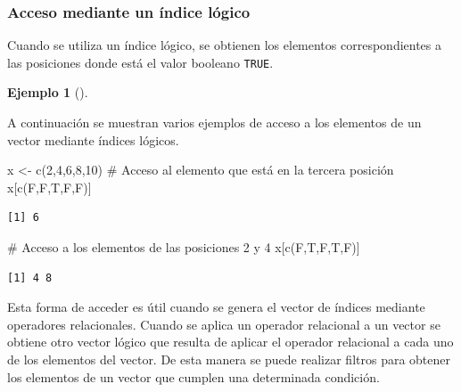 \documentclass[
  a4paper,
]{scrreport}
\newenvironment{Shaded}{\begin{snugshade}}{\end{snugshade}}
\newcommand{\CommentTok}[1]{\textcolor[rgb]{0.37,0.37,0.37}{#1}}
\newcommand{\DecValTok}[1]{\textcolor[rgb]{0.68,0.00,0.00}{#1}}
\newcommand{\FunctionTok}[1]{\textcolor[rgb]{0.28,0.35,0.67}{#1}}
\newcommand{\NormalTok}[1]{\textcolor[rgb]{0.00,0.23,0.31}{#1}}
\newcommand{\OtherTok}[1]{\textcolor[rgb]{0.00,0.23,0.31}{#1}}
\theoremstyle{definition}
\newtheorem{example}{Ejemplo}[chapter]
\theoremstyle{definition}
\theoremstyle{remark}
\begin{document}
\hypertarget{acceso-mediante-un-uxedndice-luxf3gico}{%
\subsubsection{Acceso mediante un índice
lógico}\label{acceso-mediante-un-uxedndice-luxf3gico}}

Cuando se utiliza un índice lógico, se obtienen los elementos
correspondientes a las posiciones donde está el valor booleano
\texttt{TRUE}.

\leavevmode{}%
\begin{example}[]\label{exm-acceso-vector-indice-logico}

A continuación se muestran varios ejemplos de acceso a los elementos de
un vector mediante índices lógicos.

\begin{Shaded}
\begin{Highlighting}[]
\NormalTok{x }\OtherTok{\textless{}{-}} \FunctionTok{c}\NormalTok{(}\DecValTok{2}\NormalTok{,}\DecValTok{4}\NormalTok{,}\DecValTok{6}\NormalTok{,}\DecValTok{8}\NormalTok{,}\DecValTok{10}\NormalTok{)}
\CommentTok{\# Acceso al elemento que está en la tercera posición}
\NormalTok{x[}\FunctionTok{c}\NormalTok{(F,F,T,F,F)]}
\end{Highlighting}
\end{Shaded}

\begin{verbatim}
[1] 6
\end{verbatim}

\begin{Shaded}
\begin{Highlighting}[]
\CommentTok{\# Acceso a los elementos de las posiciones 2 y 4}
\NormalTok{x[}\FunctionTok{c}\NormalTok{(F,T,F,T,F)]}
\end{Highlighting}
\end{Shaded}

\begin{verbatim}
[1] 4 8
\end{verbatim}

\end{example}

Esta forma de acceder es útil cuando se genera el vector de índices
mediante operadores relacionales. Cuando se aplica un operador
relacional a un vector se obtiene otro vector lógico que resulta de
aplicar el operador relacional a cada uno de los elementos del vector.
De esta manera se puede realizar filtros para obtener los elementos de
un vector que cumplen una determinada condición.
\end{document}
